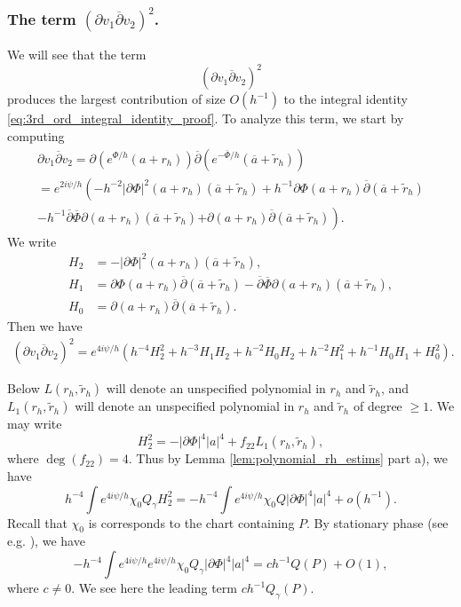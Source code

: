 \documentclass[12pt]{amsart}
\def\p{\partial}
\theoremstyle{definition}
\theoremstyle{remark}
\newcommand{\abs}[1]{\lvert #1 \rvert}
\newcommand{\tbl}[1]{\textcolor{blue}{#1}}
\newcommand{\f}[1]{\footnote{\tbl{#1}}}
\newcommand{\op}{\overline \p}
\begin{document}
\subsubsection{The term  $(\p v_1\overline \p v_2)^2$.}\label{sec:leading_term}
We will see that the term
\[
 (\p v_1\overline \p v_2)^2
\]
produces the largest contribution of size $O(h^{-1})$ to the integral identity \eqref{eq:3rd_ord_integral_identity_proof}. 
To analyze this term, we start by computing
\begin{multline*}
 \p v_1\overline \p v_2=\p(e^{\Phi/h}(a+r_h))\overline\p(e^{-\overline\Phi/h}(\overline a+\tilde r_h)) \\
 =e^{2i\psi/h}\left(-h^{-2}\abs{\p\Phi}^2(a+r_h)(\overline a+\tilde r_h) + h^{-1} \p\Phi (a+r_h) \op(\overline a+\tilde r_h)\right. \\
 -h^{-1} \op\overline\Phi \p(a+r_h) (\overline a+\tilde r_h) 
 \left.+ \p(a+r_h) \op(\overline a+\tilde r_h) \right).
\end{multline*}
We write %
\begin{align*}
 H_2&=-\abs{\p\Phi}^2(a+r_h)(\overline a+\tilde r_h), \\
 H_1&=\p\Phi (a+r_h) \op(\overline a+\tilde r_h)-\op\overline\Phi \p(a+r_h) (\overline a+\tilde r_h), \\
 H_0&=\p(a+r_h) \op(\overline a+\tilde r_h) .
\end{align*}
Then we have
\begin{align}\label{eq:Hformula}
 (\p v_1\overline \p v_2)^2=e^{4i\psi/h}\left(h^{-4}H_2^2+h^{-3}H_1H_2+h^{-2}H_0H_2+h^{-2}H_1^2+h^{-1}H_0H_1+H_0^2\right).
\end{align}

Below $L(r_h,\tilde r_h)$ will denote an unspecified polynomial in $r_h$ and $\tilde r_h$, and  $L_1(r_h,\tilde r_h)$ will denote an unspecified polynomial in $r_h$ and $\tilde r_h$ of degree $\geq 1$. We may write 
\[
 H_2^2=-\abs{\p \Phi}^4\abs{a}^4+f_{22}L_1(r_h,\tilde r_h),
\]
where $\deg(f_{22})=4$. Thus by Lemma \ref{lem:polynomial_rh_estims} part a), we have 
\[
 h^{-4}\int e^{4i\psi/h}\chi_0 Q_\gamma H_2^2=-h^{-4}\int e^{4i\psi/h} \chi_0 Q\abs{\p \Phi}^4\abs{a}^4 + o(h^{-1}).
\]
Recall that $\chi_0$ is corresponds to the chart containing $P$. 
By stationary phase (see e.g. \cite[Theorem 7.7.5]{hormander2015analysis}), we have
\[
 -h^{-4}\int e^{4i\psi/h}e^{4i\psi/h}  \chi_0  Q_\gamma\abs{\p \Phi}^4\abs{a}^4=ch^{-1}Q(P)+O(1),
\]
where $c\neq 0$. We see here the leading term $ch^{-1}Q_\gamma(P)$. 
\end{document}

